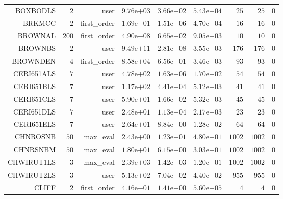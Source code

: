 \begin{longtable}{rrrrrrrrr}
BOXBODLS & \(     2\) & user & \( 9.76\)e\(+03\) & \( 3.66\)e\(+02\) & \( 5.43\)e\(-04\) & \(    25\) & \(    25\) & \(     0\) \\
BRKMCC & \(     2\) & first\_order & \( 1.69\)e\(-01\) & \( 1.51\)e\(-06\) & \( 4.70\)e\(-04\) & \(    16\) & \(    16\) & \(     0\) \\
BROWNAL & \(   200\) & first\_order & \( 4.90\)e\(-08\) & \( 6.65\)e\(-02\) & \( 9.05\)e\(-03\) & \(    10\) & \(    10\) & \(     0\) \\
BROWNBS & \(     2\) & user & \( 9.49\)e\(+11\) & \( 2.81\)e\(+08\) & \( 3.55\)e\(-03\) & \(   176\) & \(   176\) & \(     0\) \\
BROWNDEN & \(     4\) & first\_order & \( 8.58\)e\(+04\) & \( 6.56\)e\(-01\) & \( 3.46\)e\(-03\) & \(    93\) & \(    93\) & \(     0\) \\
CERI651ALS & \(     7\) & user & \( 4.78\)e\(+02\) & \( 1.63\)e\(+06\) & \( 1.70\)e\(-02\) & \(    54\) & \(    54\) & \(     0\) \\
CERI651BLS & \(     7\) & user & \( 1.17\)e\(+02\) & \( 4.41\)e\(+04\) & \( 5.12\)e\(-03\) & \(    41\) & \(    41\) & \(     0\) \\
CERI651CLS & \(     7\) & user & \( 5.90\)e\(+01\) & \( 1.66\)e\(+02\) & \( 5.32\)e\(-03\) & \(    45\) & \(    45\) & \(     0\) \\
CERI651DLS & \(     7\) & user & \( 2.48\)e\(+01\) & \( 1.13\)e\(+04\) & \( 2.17\)e\(-03\) & \(    23\) & \(    23\) & \(     0\) \\
CERI651ELS & \(     7\) & user & \( 2.64\)e\(+01\) & \( 8.84\)e\(+00\) & \( 1.28\)e\(-02\) & \(    64\) & \(    64\) & \(     0\) \\
CHNROSNB & \(    50\) & max\_eval & \( 2.43\)e\(+00\) & \( 1.23\)e\(+01\) & \( 4.80\)e\(-01\) & \(  1002\) & \(  1002\) & \(     0\) \\
CHNRSNBM & \(    50\) & max\_eval & \( 1.80\)e\(+01\) & \( 6.15\)e\(+00\) & \( 3.03\)e\(-01\) & \(  1002\) & \(  1002\) & \(     0\) \\
CHWIRUT1LS & \(     3\) & max\_eval & \( 2.39\)e\(+03\) & \( 1.42\)e\(+03\) & \( 1.20\)e\(-01\) & \(  1002\) & \(  1002\) & \(     0\) \\
CHWIRUT2LS & \(     3\) & user & \( 5.13\)e\(+02\) & \( 7.04\)e\(+02\) & \( 4.40\)e\(-02\) & \(   955\) & \(   955\) & \(     0\) \\
CLIFF & \(     2\) & first\_order & \( 4.16\)e\(-01\) & \( 1.41\)e\(+00\) & \( 5.60\)e\(-05\) & \(     4\) & \(     4\) & \(     0\) \\

\end{longtable}
